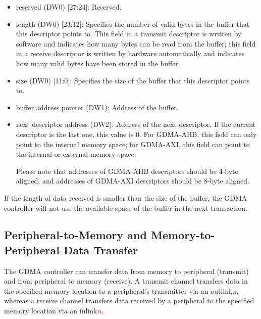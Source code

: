 \documentclass[main\_\_EN.tex]{subfiles}
\begin{document}
\begin{itemize}
    0: The received data does not have errors.\\
    1: The received data has errors.\\
    This bit is used only when UHCI or PARLIO uses the GDMA to receive data. When an error is detected in the received data segment corresponding to a descriptor, this bit in the receive descriptor is set to 1 by hardware.
    \item reserved (DW0) [27:24]: Reserved.
    \item length (DW0) [23:12]: Specifies the number of valid bytes in the buffer that this descriptor points to. This field in a transmit descriptor is written by software and indicates how many bytes can be read from the buffer; this field in a receive descriptor is written by hardware automatically and indicates how many valid bytes have been stored in the buffer.
    \item size (DW0) [11:0]: Specifies the size of the buffer that this descriptor points to.
    \item buffer address pointer (DW1): Address of the buffer.
    \item next descriptor address (DW2): Address of the next descriptor. If the current descriptor is the last one, this value is 0. For GDMA-AHB, this field can only point to the internal memory space; for GDMA-AXI, this field can point to the internal or external memory space.
        \begin{tiplisting}
            Please note that addresses of GDMA-AHB descriptors should be 4-byte aligned, and addresses of GDMA-AXI descriptors should be 8-byte aligned.
        \end{tiplisting}
\end{itemize}

If the length of data received is smaller than the size of the buffer, the GDMA controller will not use the available space of the buffer in the next transaction.

\subsection{Peripheral-to-Memory and Memory-to-Peripheral Data Transfer}

The GDMA controller can transfer data from memory to peripheral (transmit) and from peripheral to memory (receive). A transmit channel transfers data in the specified memory location to a peripheral's transmitter via an outlink\textcolor{red}{\it{n}}, whereas a receive channel transfers data received by a peripheral to the specified memory location via an inlink\textcolor{red}{\it{n}}.
\end{document}

